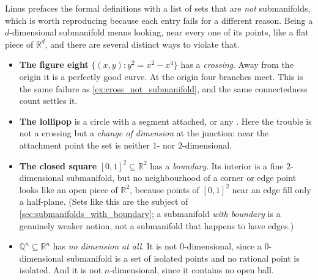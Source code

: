 Linus prefaces the formal definitions with a list of sets that are \emph{not} submanifolds, which
is worth reproducing because each entry fails for a different reason. Being a $d$-dimensional
submanifold means looking, near every one of its points, like a flat piece of $\mathbb{R}^d$, and
there are several distinct ways to violate that.

\begin{itemize}
  \item \textbf{The figure eight} $\{(x,y) : y^2 = x^2 - x^4\}$ has a \emph{crossing}. Away from
    the origin it is a perfectly good curve. At the origin four branches meet. This is the same
    failure as \cref{ex:cross_not_submanifold}, and the same connectedness count settles it.
  \item \textbf{The lollipop} is a circle with a segment attached, or any . Here the trouble is not a crossing but a \emph{change of dimension} at the
    junction: near the attachment point the set is neither $1$- nor $2$-dimensional.
  \item \textbf{The closed square} $[0,1]^2 \subseteq \mathbb{R}^2$ has a \emph{boundary}. Its
    interior is a fine $2$-dimensional submanifold, but no neighbourhood of a corner or edge
    point looks like an open piece of $\mathbb{R}^2$, because points of $[0,1]^2$ near an edge
    fill only a half-plane. (Sets like this are the subject of
    \cref{sec:submanifolds_with_boundary}; a submanifold \emph{with boundary} is a genuinely
    weaker notion, not a submanifold that happens to have edges.)
  \item \textbf{$\mathbb{Q}^n \subseteq \mathbb{R}^n$} has \emph{no dimension at all}. It is not
    $0$-dimensional, since a $0$-dimensional submanifold is a set of isolated points and no
    rational point is isolated. And it is not $n$-dimensional, since it contains no open ball.
\end{itemize}

